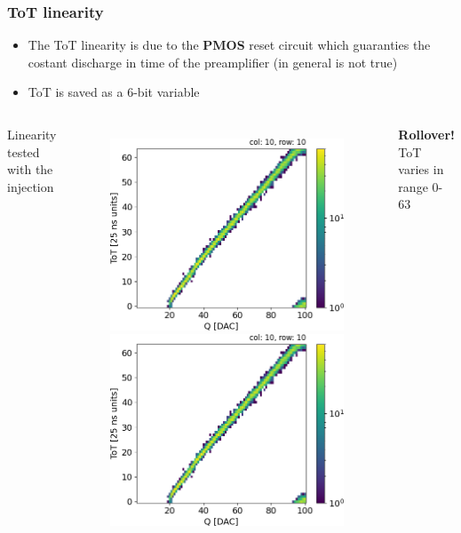     \begin{frame}
        \frametitle{ToT linearity}
        \begin{itemize}
            \item The ToT linearity is due to the \textbf{PMOS} reset circuit which guaranties the costant discharge in time of the preamplifier (in general is not true)
            \item ToT is saved as a 6-bit variable
        \end{itemize}
        \medskip
        \medskip
        \medskip
        \begin{columns}
                \centering
                Linearity tested with the injection
                \begin{figure}[h!]
                    \includegraphics[width=.49\linewidth]{figures/charaterization/ToT_rollover.png}
                    \includegraphics[width=.49\linewidth]{figures/charaterization/ToT_rollover.png} 
                \end{figure}
                \textbf{Rollover!}\\
                ToT varies in range 0-63

        \end{columns}
    \end{frame}    

